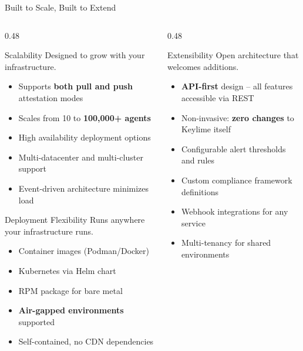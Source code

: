 \begin{frame}{Built to Scale, Built to Extend}
  \begin{columns}[T]
    \begin{column}{0.48\textwidth}
      \begin{block}{Scalability}
        \tiny
        Designed to grow with your infrastructure.
      \end{block}
      \tiny
      \begin{itemize}
        \item Supports \textbf{both pull and push} attestation modes
        \item Scales from 10 to \textbf{100,000+ agents}
        \item High availability deployment options
        \item Multi-datacenter and multi-cluster support
        \item Event-driven architecture minimizes load
      \end{itemize}

      \vspace{0.1cm}

      \begin{block}{Deployment Flexibility}
        \tiny
        Runs anywhere your infrastructure runs.
      \end{block}
      \tiny
      \begin{itemize}
        \item Container images (Podman/Docker)
        \item Kubernetes via Helm chart
        \item RPM package for bare metal
        \item \textbf{Air-gapped environments} supported
        \item Self-contained, no CDN dependencies
      \end{itemize}
    \end{column}
    \begin{column}{0.48\textwidth}
      \begin{block}{Extensibility}
        \tiny
        Open architecture that welcomes additions.
      \end{block}
      \tiny
      \begin{itemize}
        \item \textbf{API-first} design -- all features accessible via REST
        \item Non-invasive: \textbf{zero changes} to Keylime itself
        \item Configurable alert thresholds and rules
        \item Custom compliance framework definitions
        \item Webhook integrations for any service
        \item Multi-tenancy for shared environments
      \end{itemize}


\end{column}
\end{columns}
\end{frame}
